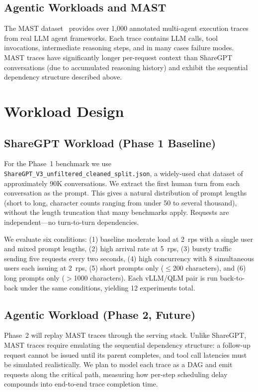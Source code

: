 \documentclass[10pt, twocolumn, letterpaper]{article}
\begin{document}
\subsection{Agentic Workloads and MAST}

The MAST dataset~\cite{mast} provides over 1,000 annotated multi-agent execution traces from real LLM agent frameworks. Each trace contains LLM calls, tool invocations, intermediate reasoning steps, and in many cases failure modes. MAST traces have significantly longer per-request context than ShareGPT conversations (due to accumulated reasoning history) and exhibit the sequential dependency structure described above.

\section{Workload Design}

\subsection{ShareGPT Workload (Phase 1 Baseline)}

For the Phase~1 benchmark we use \texttt{ShareGPT\_V3\_unfiltered\_cleaned\_split.json}, a widely-used chat dataset of approximately 90K conversations. We extract the first human turn from each conversation as the prompt. This gives a natural distribution of prompt lengths (short to long, character counts ranging from under 50 to several thousand), without the length truncation that many benchmarks apply. Requests are independent---no turn-to-turn dependencies.

We evaluate six conditions: (1) baseline moderate load at 2~rps with a single user and mixed prompt lengths, (2) high arrival rate at 5~rps, (3) bursty traffic sending five requests every two seconds, (4) high concurrency with 8 simultaneous users each issuing at 2~rps, (5) short prompts only ($\leq$200 characters), and (6) long prompts only ($>$1000 characters). Each vLLM/QLM pair is run back-to-back under the same conditions, yielding 12 experiments total.

\subsection{Agentic Workload (Phase 2, Future)}

Phase~2 will replay MAST traces through the serving stack. Unlike ShareGPT, MAST traces require emulating the sequential dependency structure: a follow-up request cannot be issued until its parent completes, and tool call latencies must be simulated realistically. We plan to model each trace as a DAG and emit requests along the critical path, measuring how per-step scheduling delay compounds into end-to-end trace completion time.
\end{document}
